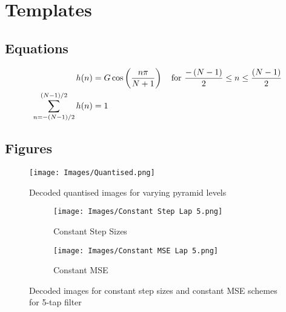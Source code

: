 
\section{Templates} \label{sec:template}
\subsection{Equations} \label{sec:eqn}
\begin{align}
\centering
    h(n) & = G \cos \left( \frac{n\pi}{N+1} \right) \quad \text{for} {\ } \frac{-\left(N-1\right)}{2} \leq n \leq \frac{\left(N-1\right)}{2} \\
    \sum_{n = -(N-1)/2}^{(N-1)/2} h(n) & = 1
    \label{eqn:halfcos}
\end{align}

\subsection{Figures} \label{sec:fig}
\begin{figure}[!htbp]
    \centering
    \texttt{[image: Images/Quantised.png]}
    \caption{Decoded quantised images for varying pyramid levels}
    \label{fig:quantised}
\end{figure}

\begin{figure}[h]
\centering
\begin{subfigure}{.5\textwidth}
  \centering
  \texttt{[image: Images/Constant Step Lap 5.png]}
  \caption{Constant Step Sizes}
  \label{fig:const_step_lap5}
\end{subfigure}%
\begin{subfigure}{.5\textwidth}
  \centering
  \texttt{[image: Images/Constant MSE Lap 5.png]}
  \caption{Constant MSE}
  \label{fig:const_mse_lap5}
\end{subfigure}
\caption{Decoded images for constant step sizes and constant MSE schemes for 5-tap filter}
\label{fig:lap5}
\end{figure}

